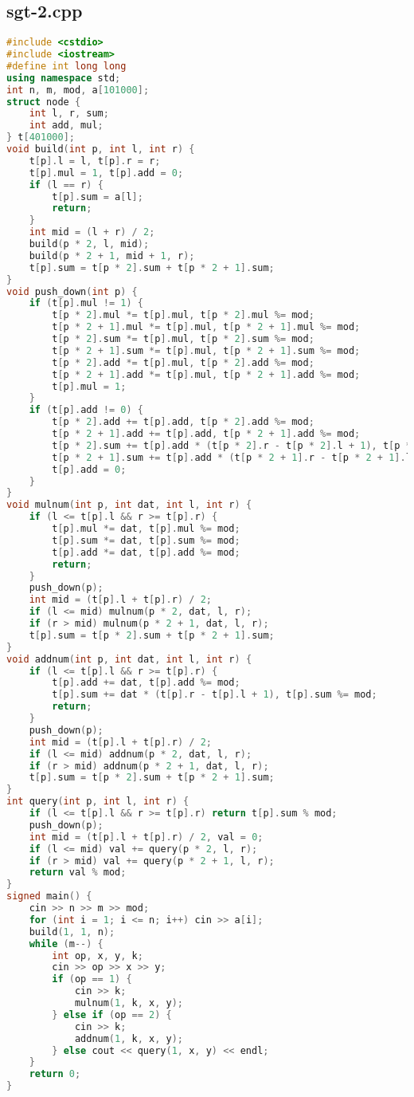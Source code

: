 \documentclass[9pt, a4paper, oneside]{book}
\begin{document}
\subsection{sgt-2.cpp}
\begin{lstlisting}[language={C++}]
#include <cstdio>
#include <iostream>
#define int long long
using namespace std;
int n, m, mod, a[101000];
struct node {
    int l, r, sum;
    int add, mul;
} t[401000];
void build(int p, int l, int r) {
    t[p].l = l, t[p].r = r;
    t[p].mul = 1, t[p].add = 0;
    if (l == r) {
        t[p].sum = a[l];
        return;
    }
    int mid = (l + r) / 2;
    build(p * 2, l, mid);
    build(p * 2 + 1, mid + 1, r);
    t[p].sum = t[p * 2].sum + t[p * 2 + 1].sum;
}
void push_down(int p) {
    if (t[p].mul != 1) {
        t[p * 2].mul *= t[p].mul, t[p * 2].mul %= mod;
        t[p * 2 + 1].mul *= t[p].mul, t[p * 2 + 1].mul %= mod;
        t[p * 2].sum *= t[p].mul, t[p * 2].sum %= mod;
        t[p * 2 + 1].sum *= t[p].mul, t[p * 2 + 1].sum %= mod;
        t[p * 2].add *= t[p].mul, t[p * 2].add %= mod;
        t[p * 2 + 1].add *= t[p].mul, t[p * 2 + 1].add %= mod;
        t[p].mul = 1;
    }
    if (t[p].add != 0) {
        t[p * 2].add += t[p].add, t[p * 2].add %= mod;
        t[p * 2 + 1].add += t[p].add, t[p * 2 + 1].add %= mod;
        t[p * 2].sum += t[p].add * (t[p * 2].r - t[p * 2].l + 1), t[p * 2].sum %= mod;
        t[p * 2 + 1].sum += t[p].add * (t[p * 2 + 1].r - t[p * 2 + 1].l + 1), t[p * 2 + 1].sum %= mod;
        t[p].add = 0;
    }
}
void mulnum(int p, int dat, int l, int r) {
    if (l <= t[p].l && r >= t[p].r) {
        t[p].mul *= dat, t[p].mul %= mod;
        t[p].sum *= dat, t[p].sum %= mod;
        t[p].add *= dat, t[p].add %= mod;
        return;
    }
    push_down(p);
    int mid = (t[p].l + t[p].r) / 2;
    if (l <= mid) mulnum(p * 2, dat, l, r);
    if (r > mid) mulnum(p * 2 + 1, dat, l, r);
    t[p].sum = t[p * 2].sum + t[p * 2 + 1].sum;
}
void addnum(int p, int dat, int l, int r) {
    if (l <= t[p].l && r >= t[p].r) {
        t[p].add += dat, t[p].add %= mod;
        t[p].sum += dat * (t[p].r - t[p].l + 1), t[p].sum %= mod;
        return;
    }
    push_down(p);
    int mid = (t[p].l + t[p].r) / 2;
    if (l <= mid) addnum(p * 2, dat, l, r);
    if (r > mid) addnum(p * 2 + 1, dat, l, r);
    t[p].sum = t[p * 2].sum + t[p * 2 + 1].sum;
}
int query(int p, int l, int r) {
    if (l <= t[p].l && r >= t[p].r) return t[p].sum % mod;
    push_down(p);
    int mid = (t[p].l + t[p].r) / 2, val = 0;
    if (l <= mid) val += query(p * 2, l, r);
    if (r > mid) val += query(p * 2 + 1, l, r);
    return val % mod;
}
signed main() {
    cin >> n >> m >> mod;
    for (int i = 1; i <= n; i++) cin >> a[i];
    build(1, 1, n);
    while (m--) {
        int op, x, y, k;
        cin >> op >> x >> y;
        if (op == 1) {
            cin >> k;
            mulnum(1, k, x, y);
        } else if (op == 2) {
            cin >> k;
            addnum(1, k, x, y);
        } else cout << query(1, x, y) << endl;
    }
    return 0;
}\end{lstlisting}
\end{document}
